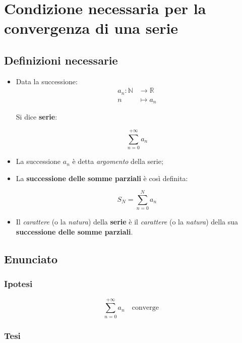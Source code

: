 \documentclass[../../dimostrazioni]{subfiles}
\begin{document}
    \chapter{Condizione necessaria per la convergenza di una serie}
    \label{CNconvergenza}

        \section*{Definizioni necessarie}

            \begin{itemize}
                \item Data la successione:
                        \begin{align*}
                            a_n : \mathbb{N} &\longrightarrow \mathbb{R}\\
                            n &\longmapsto a_n 
                        \end{align*}
    
                        Si dice \textbf{serie}:

                        \[  \sum_{n=0}^{+\infty} a_n\]

                \item La successione \(a_n\) è detta \emph{argomento} della serie;
                \item La \textbf{successione delle somme parziali} è così definita:
                      
                        \[  S_N = \sum_{n=0}^{N} a_n\]
                    
                \item Il \emph{carattere} (o la \emph{natura}) della \textbf{serie} è il \emph{carattere} (o la \emph{natura}) della sua \textbf{successione delle somme parziali}.
            \end{itemize}
           

        \section*{Enunciato}

            \subsection*{Ipotesi}

                \[  \sum_{n=0}^{+\infty} a_n \quad \text{converge} \]
                
            \subsection*{Tesi}
\end{document}
